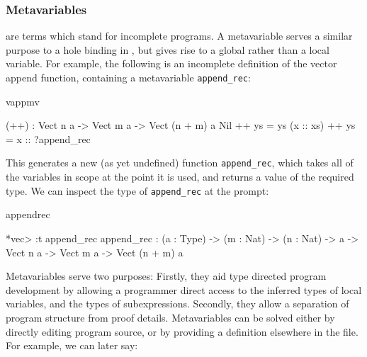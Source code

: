 
\subsubsection{Metavariables}

 are terms which stand for incomplete programs. A
metavariable serves a similar
purpose to a hole binding in \TT{}, but gives rise to a global rather than a
local variable. For example, the following is an incomplete definition of
the vector append function, containing a metavariable \texttt{append\_rec}:

\begin{SaveVerbatim}{vappmv}

(++) : Vect n a -> Vect m a -> Vect (n + m) a
Nil       ++ ys = ys
(x :: xs) ++ ys = x :: ?append_rec

\end{SaveVerbatim}

This generates a new (as yet undefined)
function \texttt{append\_rec}, which takes all of the variables
in scope at the point it is used, and returns a value of the required type.
We can inspect the type of \texttt{append\_rec} at the \Idris{} prompt:

\begin{SaveVerbatim}{appendrec}

*vec> :t append_rec
append_rec : (a : Type) -> (m : Nat) -> (n : Nat) -> a -> 
             Vect n a -> Vect m a -> Vect (n + m) a

\end{SaveVerbatim}

Metavariables serve two purposes: Firstly, they aid type directed program development
by allowing a programmer direct access to the inferred types of local variables, and
the types of subexpressions. Secondly, they allow a separation of program structure
from proof details. Metavariables can be solved either by directly editing program
source, or by providing a definition elsewhere in the file. For example, we can later say:

